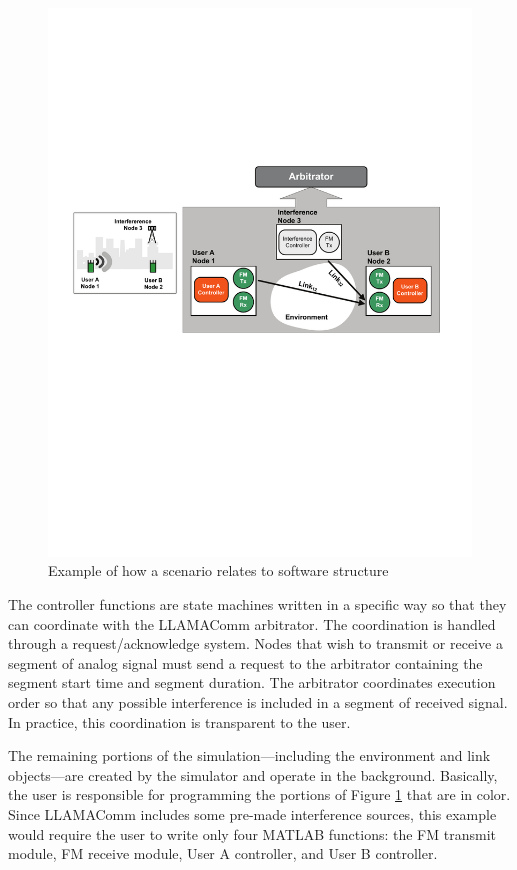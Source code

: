 \begin{figure}[h]
\centering
\includegraphics[width=6in]{figs/Software_Overview}
\caption{Example of how a scenario relates to software structure}
\label{fig:softwareOverview}
\end{figure}

The controller functions are state machines written in a specific
way so that they can coordinate with the LLAMAComm arbitrator.  The
coordination is handled through a request/acknowledge system.  Nodes
that wish to transmit or receive a segment of analog signal must
send a request to the arbitrator containing the segment start time
and segment duration.  The arbitrator coordinates execution order so
that any possible interference is included in a segment of received
signal.  In practice, this coordination is transparent to the user.

The remaining portions of the simulation---including the environment
and link objects---are created by the simulator and operate in the
background.  Basically, the user is responsible for programming the
portions of Figure \ref{fig:softwareOverview} that are in color.
Since LLAMAComm includes some pre-made interference sources, this
example would require the user to write only four MATLAB functions:
the FM transmit module, FM receive module, User A controller, and
User B controller.

